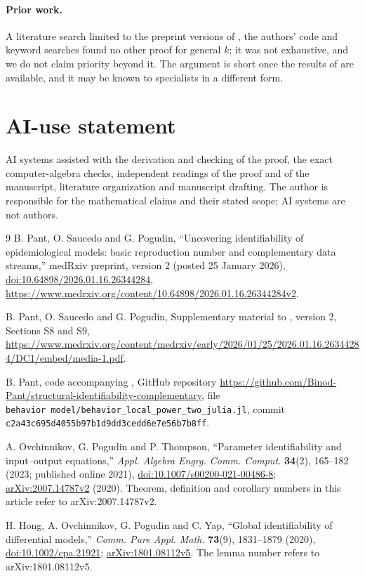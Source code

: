 \documentclass[10pt,a4paper]{article}
\theoremstyle{definition}
\theoremstyle{remark}
\begin{document}
\paragraph{Prior work.}
A literature search limited to the preprint versions of \cite{PSP}, the
authors' code and keyword searches found no other proof for general $k$;
it was not exhaustive, and we do not claim priority beyond it. The
argument is short once the results of \cite{OPT} are available, and it
may be known to specialists in a different form.

\section*{AI-use statement}
AI systems assisted with the derivation and checking of the proof, the
exact computer-algebra checks, independent readings of the proof and of
the manuscript, literature organization and manuscript drafting. The
author is responsible for the mathematical claims and their stated scope;
AI systems are not authors.

{\raggedright
\begin{thebibliography}{9}
B. Pant, O. Saucedo and G. Pogudin,
``Uncovering identifiability of epidemiological models: basic
reproduction number and complementary data streams,''
medRxiv preprint, version 2 (posted 25 January 2026),
\href{https://doi.org/10.64898/2026.01.16.26344284}{doi:10.64898/2026.01.16.26344284},
\url{https://www.medrxiv.org/content/10.64898/2026.01.16.26344284v2}.

B. Pant, O. Saucedo and G. Pogudin,
Supplementary material to \cite{PSP}, version 2, Sections S8 and S9,
\url{https://www.medrxiv.org/content/medrxiv/early/2026/01/25/2026.01.16.26344284/DC1/embed/media-1.pdf}.

B. Pant, code accompanying \cite{PSP}, GitHub repository
\url{https://github.com/Binod-Pant/structural-identifiability-complementary},
file \texttt{behavior~model/behavior\_local\_power\_two\_julia.jl},
commit \nolinkurl{c2a43c695d4055b97b1d9dd3cedd6e7e56b7b8ff}.

A. Ovchinnikov, G. Pogudin and P. Thompson,
``Parameter identifiability and input--output equations,''
\emph{Appl. Algebra Engrg. Comm. Comput.} \textbf{34}(2), 165--182 (2023;
published online 2021),
\href{https://doi.org/10.1007/s00200-021-00486-8}{doi:10.1007/s00200-021-00486-8};
\href{https://arxiv.org/abs/2007.14787v2}{arXiv:2007.14787v2} (2020).
Theorem, definition and corollary numbers in this article refer to
arXiv:2007.14787v2.

H. Hong, A. Ovchinnikov, G. Pogudin and C. Yap,
``Global identifiability of differential models,''
\emph{Comm. Pure Appl. Math.} \textbf{73}(9), 1831--1879 (2020),
\href{https://doi.org/10.1002/cpa.21921}{doi:10.1002/cpa.21921};
\href{https://arxiv.org/abs/1801.08112v5}{arXiv:1801.08112v5}.
The lemma number refers to arXiv:1801.08112v5.
\end{thebibliography}
}
\end{document}
